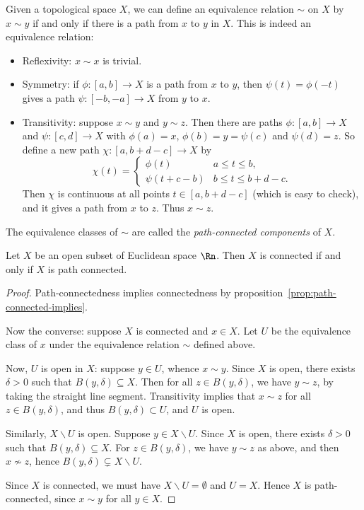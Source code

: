 Given a topological space $X$, we can define an equivalence relation $\sim$ on $X$ by $x\sim y$ if and only if there is a path from $x$ to $y$ in $X$. This is indeed an equivalence relation:
\begin{itemize}
	\shortskip
	\item Reflexivity: $x\sim x$ is trivial.
	\item Symmetry: if $\phi:[a,b] \to X$ is a path from $x$ to $y$, then $\psi(t) = \phi(-t)$ gives a path $\psi:[-b,-a] \to X$ from $y$ to $x$.
	\item Transitivity: suppose $x\sim y$ and $y\sim z$. Then there are paths $\phi:[a,b] \to X$ and $\psi:[c,d] \to X$ with $\phi(a)=x$, $\phi(b) = y = \psi(c)$ and $\psi(d)=z$. So define a new path $\chi:[a,b+d-c] \to X$ by
	\begin{equation*}
		\chi(t) =
		\begin{cases}
			\phi(t) & a\leq t\leq b, \\ %
			\psi(t+c-b) & b\leq t\leq b+d-c.
		\end{cases}
	\end{equation*}
	Then $\chi$ is continuous at all points $t\in[a,b+d-c]$ (which is easy to check), and it gives a path from $x$ to $z$. Thus $x\sim z$.
\end{itemize}

\begin{definition}
	The equivalence classes of $\sim$ are called the \emph{path-connected components} of $X$.
\end{definition}

\begin{theorem}
	Let $X$ be an open subset of Euclidean space $\Rn$. Then $X$ is connected if and only if $X$ is path connected.
\end{theorem}

\begin{proof}
	Path-connectedness implies connectedness by proposition~\ref{prop:path-connected-implies}.

	Now the converse: suppose $X$ is connected and $x\in X$. Let $U$ be the equivalence class of $x$ under the equivalence relation $\sim$ defined above.

	Now, $U$ is open in $X$: suppose $y\in U$, whence $x \sim y$. Since $X$ is open, there exists $\delta>0$ such that $B(y,\delta) \subseteq X$. Then for all $z\in B(y,\delta)$, we have $y\sim z$, by taking the straight line segment. Transitivity implies that $x\sim z$ for all $z\in B(y,\delta)$, and thus $B(y,\delta) \subset U$, and $U$ is open.

	Similarly, $X\backslash U$ is open. Suppose $y\in X\backslash U$. Since $X$ is open, there exists $\delta>0$ such that $B(y,\delta) \subseteq X$. For $z\in B(y,\delta)$, we have $y\sim z$ as above, and then $x \not\sim z$, hence $B(y,\delta) \subsetneq X\backslash U$.

	Since $X$ is connected, we must have $X\backslash U=\emptyset$ and $U=X$. Hence $X$ is path-connected, since $x\sim y$ for all $y\in X$.
\end{proof}

